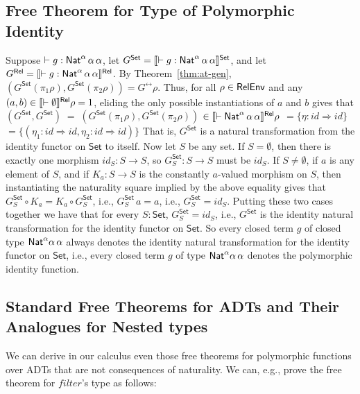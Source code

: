 \documentclass{lmcs}
\theoremstyle{plain}\newtheorem{satz}[thm]{Satz}
\newcommand{\set}{\mathsf{Set}}
\renewcommand{\id}{\mathit{id}}
\begin{document}
\subsection{Free Theorem for Type of Polymorphic
  Identity}\label{sec:identity} 

Suppose $ \vdash g : \mathsf{Nat}^\alpha \,\alpha\,\alpha$, let $G^\set =
\setsem{\vdash g : \Nat^\alpha \,\alpha\,\alpha}$, and let $G^{\mathsf{Rel}} =
\llbracket{\vdash g : \mathsf{Nat}^\alpha \,\alpha\,\alpha}\rrbracket^{\mathsf{Rel}}$.  By
Theorem~\ref{thm:at-gen}, $(G^\set(\pi_1\rho),G^\set(\pi_2\rho))
= G^\rel\rho$. Thus, for all $\rho \in \mathsf{RelEnv}$ and any $(a, b) \in
\llbracket{\vdash \emptyset}\rrbracket^{\mathsf{Rel}}\rho = 1$, eliding the only possible
instantiations of $a$ and $b$ gives that
$(G^\set, G^\set) \; = \; (G^\set(\pi_1 \rho), G^\set (\pi_2 \rho))$
$ \in \llbracket{\vdash \mathsf{Nat}^\alpha \,\alpha\,\alpha}\rrbracket^{\mathsf{Rel}}\rho$
$ =  \{\eta : \id \Rightarrow \id\}$
$ =  \{(\eta_1 : \id \Rightarrow \id, \eta_2 : \id \Rightarrow
\id)\}$
That is, $G^\set$ is a natural transformation from the identity
functor on $\set$ to itself. Now let $S$ be any set.  If $S =
\emptyset$, then there is exactly one morphism $\id_S: S \to S$, so
$G^\set_S : S \to S$ must be $\id_S$. If $S \not = \emptyset$, if
$a$ is any element of $S$, and if $K_a :S \to S$ is the constantly
$a$-valued morphism on $S$, then instantiating the naturality square
implied by the above equality gives that $G^\set_S \circ K_a = K_a
\circ G^\set_S$, i.e., $G^\set_S \, a = a$, i.e., $G^\set_S = \id_S$.
Putting these two cases together we have that for every $S : \set$,
$G^\set_S = \id_S$, i.e., $G^\set$ is the identity natural
transformation for the identity functor on $\set$. So every closed
term $g$ of closed type $\mathsf{Nat}^\alpha\alpha\,\alpha$ always denotes the
identity natural transformation for the identity functor on $\set$,
i.e., every closed term $g$ of type $\mathsf{Nat}^\alpha\alpha\,\alpha$
denotes the polymorphic identity function.

\subsection{Standard Free Theorems for ADTs and Their Analogues for
  Nested types}\label{sec:ft-adt}

We can derive in our calculus even those free theorems for polymorphic
functions over ADTs that are not consequences of naturality.  We can,
e.g., prove the free theorem for $\mathit{filter}$'s type as follows:
\end{document}

